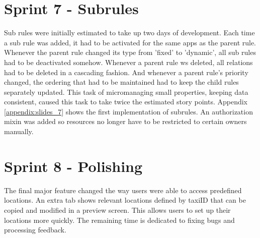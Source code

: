 %
\section{Sprint 7 - Subrules}
Sub rules were initially estimated to take up two days of development. Each time a sub rule was added, it had to be activated for the same apps as the parent rule. Whenever the parent rule changed its type from 'fixed' to 'dynamic', all sub rules had to be deactivated somehow. Whenever a parent rule ws deleted, all relations had to be deleted in a cascading fashion. And whenever a parent rule's priority changed, the ordering that had to be maintained had to keep the child rules separately updated. This task of micromanaging small properties, keeping data consistent, caused this task to take twice the estimated story points. Appendix \ref{appendix:slides_7} shows the first implementation of subrules. An authorization mixin was added so resources no longer have to be restricted to certain owners manually.

%
\section{Sprint 8 - Polishing}
The final major feature changed the way users were able to access predefined locations. An extra tab shows relevant locations defined by taxiID that can be copied and modified in a preview screen. This allows users to set up their locations more quickly. The remaining time is dedicated to fixing bugs and processing feedback.